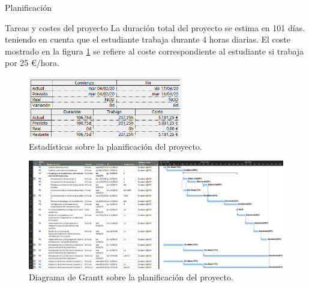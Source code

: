 \begin{chapter}{Planificación}
\begin{section}{Tareas y costes del proyecto}
La duración total del proyecto se estima en 101 días. teniendo en cuenta que el estudiante trabaja durante 4 horas diarias. El coste mostrado en la figura \ref{fig:estadisticasproyecto} se refiere al coste correspondiente al estudiante si trabaja por 25 €/hora. 
\begin{figure}[h!]
  \centering
  \includegraphics[width=0.6\textwidth]{imaxes/extras/estadisticasProyecto.png}
  \caption{Estadísticas sobre la planificación del proyecto.}
  \label{fig:estadisticasproyecto}
\end{figure}
\FloatBarrier
\begin{landscape}
\begin{figure}[hp]
  \centering
  \includegraphics[width=1.5\textwidth]{imaxes/extras/diagramaGranttt.png}
  \caption{Diagrama de Grantt sobre la planificación del proyecto.}
  \label{fig:tareasproyecto}
\end{figure}
\end{landscape}
\FloatBarrier
\end{section}


\end{chapter}
